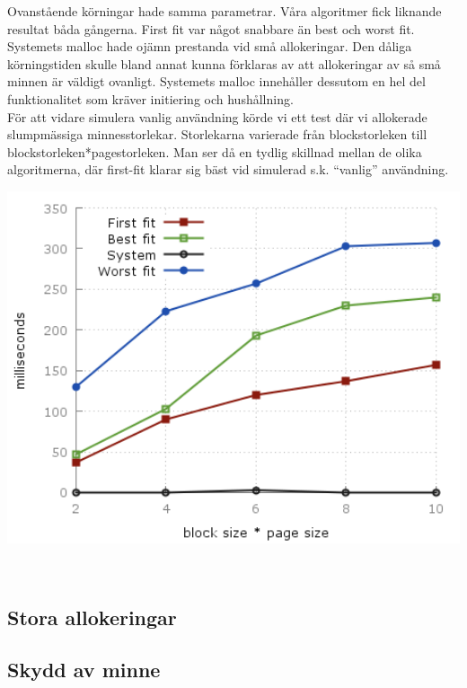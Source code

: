 \documentclass[paper=a4, fontsize=11pt]{scrartcl} %
\numberwithin{equation}{section} %
\numberwithin{figure}{section} %
\numberwithin{table}{section} %
\begin{document}
Ovanstående körningar hade samma parametrar.
Våra algoritmer fick liknande resultat båda gångerna.
First fit var något snabbare än best och worst fit.
Systemets malloc hade ojämn prestanda vid små allokeringar. 
Den dåliga körningstiden skulle bland annat kunna förklaras av att allokeringar
av så små minnen är väldigt ovanligt.
Systemets malloc innehåller dessutom en hel del funktionalitet som kräver
initiering och hushållning.\\

För att vidare simulera vanlig användning körde vi ett test där vi allokerade
slumpmässiga minnesstorlekar.
Storlekarna varierade från blockstorleken till blockstorleken*pagestorleken.
Man ser då en tydlig skillnad mellan de olika algoritmerna, där first-fit
klarar sig bäst vid simulerad s.k. ``vanlig'' användning.

\begin{minipage}{.5\textwidth}
    \centering
    \includegraphics[width=1\textwidth]{images/time_plot_rand.png}
    \label{fig:p3}
\end{minipage}\\


\subsection{Stora allokeringar}


\subsection{Skydd av minne}
\end{document}
